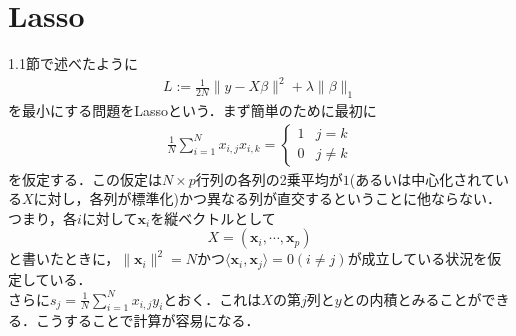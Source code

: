 \documentclass{jsarticle}
\theoremstyle{definition}
\theoremstyle{mystyle} %
\begin{document}
\large
\section*{Lasso}
1.1節で述べたように
\begin{align}
\tag{1.5}
L := \frac{1}{2N}\|y-X\beta\|^2+\lambda \|\beta\|_1
\end{align}
を最小にする問題をLassoという．まず簡単のために最初に
\begin{align}
\label{kantan}
\frac{1}{N}\sum_{i=1}^N x_{i,j}x_{i,k} =\begin{cases}
1 & j=k\\
0 & j\neq k
\end{cases}
\end{align}
を仮定する．この仮定は$N\times p$行列の各列の2乗平均が$1$(あるいは中心化されている$X$に対し，各列が標準化)かつ異なる列が直交するということに他ならない．つまり，各$i$に対して${\bm x}_i$を縦ベクトルとして
$$X = ({\bm x}_i,\cdots ,{\bm x}_p)$$
と書いたときに，$\|{\bm x}_i\|^2=N$かつ$\langle{\bm x}_i, {\bm x}_j \rangle=0(i\neq j)$が成立している状況を仮定している．\\
さらに$s_j = \displaystyle\frac{1}{N}\sum_{i=1}^N x_{i,j} y_i$とおく．これは$X$の第$j$列と$y$との内積とみることができる．こうすることで計算が容易になる．\\
\end{document}
